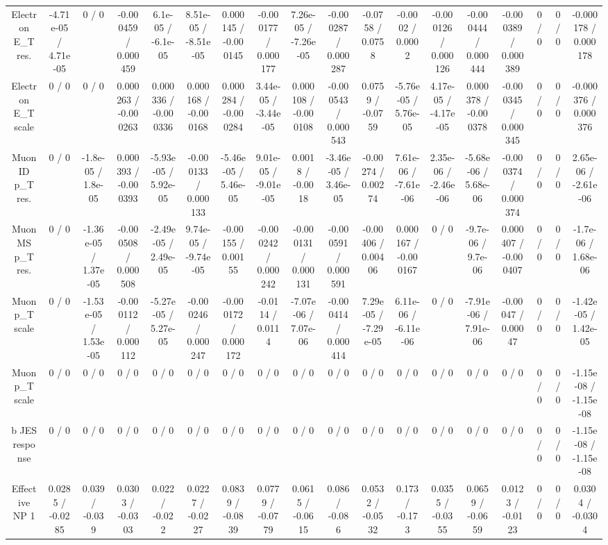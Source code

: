 \documentclass[10pt]{article}
\begin{document}
\begin{table}[htbp]
\begin{center}
\begin{tabular}{|c|c|c|c|c|c|c|c|c|c|c|c|c|c|c|c|c|c|}
  Electron E_{T} res. & -4.71e-05 / 4.71e-05 & 0 / 0 & -0.000459 / 0.000459 & 6.1e-05 / -6.1e-05 & 8.51e-05 / -8.51e-05 & 0.000145 / -0.000145 & -0.000177 / 0.000177 & 7.26e-05 / -7.26e-05 & -0.000287 / 0.000287 & -0.0758 / 0.0758 & -0.0002 / 0.0002 & -0.000126 / 0.000126 & -0.000444 / 0.000444 & -0.000389 / 0.000389 & 0 / 0 & 0 / 0 & -0.000178 / 0.000178 \\ 
  Electron E_{T} scale & 0 / 0 & 0 / 0 & 0.000263 / -0.000263 & 0.000336 / -0.000336 & 0.000168 / -0.000168 & 0.000284 / -0.000284 & 3.44e-05 / -3.44e-05 & 0.000108 / -0.000108 & -0.000543 / 0.000543 & 0.0759 / -0.0759 & -5.76e-05 / 5.76e-05 & 4.17e-05 / -4.17e-05 & 0.000378 / -0.000378 & -0.000345 / 0.000345 & 0 / 0 & 0 / 0 & -0.000376 / 0.000376 \\ 
  Muon ID p_{T} res. & 0 / 0 & -1.8e-05 / 1.8e-05 & 0.000393 / -0.000393 & -5.93e-05 / 5.92e-05 & -0.000133 / 0.000133 & -5.46e-05 / 5.46e-05 & 9.01e-05 / -9.01e-05 & 0.0018 / -0.0018 & -3.46e-05 / 3.46e-05 & -0.00274 / 0.00274 & 7.61e-06 / -7.61e-06 & 2.35e-06 / -2.46e-06 & -5.68e-06 / 5.68e-06 & -0.000374 / 0.000374 & 0 / 0 & 0 / 0 & 2.65e-06 / -2.61e-06 \\ 
  Muon MS p_{T} res. & 0 / 0 & -1.36e-05 / 1.37e-05 & -0.000508 / 0.000508 & -2.49e-05 / 2.49e-05 & 9.74e-05 / -9.74e-05 & -0.00155 / 0.00155 & -0.000242 / 0.000242 & -0.000131 / 0.000131 & -0.000591 / 0.000591 & -0.00406 / 0.00406 & 0.000167 / -0.000167 & 0 / 0 & -9.7e-06 / 9.7e-06 & 0.000407 / -0.000407 & 0 / 0 & 0 / 0 & -1.7e-06 / 1.68e-06 \\ 
  Muon p_{T} scale & 0 / 0 & -1.53e-05 / 1.53e-05 & -0.000112 / 0.000112 & -5.27e-05 / 5.27e-05 & -0.000246 / 0.000247 & -0.000172 / 0.000172 & -0.0114 / 0.0114 & -7.07e-06 / 7.07e-06 & -0.000414 / 0.000414 & 7.29e-05 / -7.29e-05 & 6.11e-06 / -6.11e-06 & 0 / 0 & -7.91e-06 / 7.91e-06 & -0.00047 / 0.00047 & 0 / 0 & 0 / 0 & -1.42e-05 / 1.42e-05 \\ 
  Muon p_{T} scale & 0 / 0 & 0 / 0 & 0 / 0 & 0 / 0 & 0 / 0 & 0 / 0 & 0 / 0 & 0 / 0 & 0 / 0 & 0 / 0 & 0 / 0 & 0 / 0 & 0 / 0 & 0 / 0 & 0 / 0 & 0 / 0 & -1.15e-08 / -1.15e-08 \\ 
  b JES response & 0 / 0 & 0 / 0 & 0 / 0 & 0 / 0 & 0 / 0 & 0 / 0 & 0 / 0 & 0 / 0 & 0 / 0 & 0 / 0 & 0 / 0 & 0 / 0 & 0 / 0 & 0 / 0 & 0 / 0 & 0 / 0 & -1.15e-08 / -1.15e-08 \\ 
  Effective NP 1 & 0.0285 / -0.0285 & 0.039 / -0.039 & 0.0303 / -0.0303 & 0.022 / -0.022 & 0.0227 / -0.0227 & 0.0839 / -0.0839 & 0.0779 / -0.0779 & 0.0615 / -0.0615 & 0.086 / -0.086 & 0.0532 / -0.0532 & 0.173 / -0.173 & 0.0355 / -0.0355 & 0.0659 / -0.0659 & 0.0123 / -0.0123 & 0 / 0 & 0 / 0 & 0.0304 / -0.0304 \\ 

\end{tabular}
\end{center}
\end{table}
\end{document}
